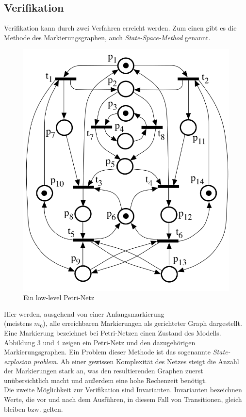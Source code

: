 \documentclass[11pt,onecolumn,a4paper,DIV=calc]{scrartcl}
\begin{document}
\newpage
\subsection{Verifikation}
Verifikation kann durch zwei Verfahren erreicht werden. Zum einen gibt es die Methode des Markierungsgraphen, auch \textit{State-Space-Method} genannt. 
\begin{figure}
\begin{center}
\includegraphics[scale=0.35]{netz3.PNG}\caption{Ein low-level Petri-Netz}
\end{center}
\end{figure}
Hier werden, ausgehend von einer Anfangsmarkierung \\(meistens $m_0$), alle erreichbaren Markierungen als gerichteter Graph dargestellt. Eine Markierung bezeichnet bei Petri-Netzen einen Zustand des Modells. Abbildung 3 und 4 zeigen ein Petri-Netz und den dazugehörigen Markierungsgraphen.
Ein Problem dieser Methode ist das sogenannte \textit{State-explosion problem}. Ab einer gewissen Komplexität des Netzes steigt die Anzahl der Markierungen stark an, was den resultierenden Graphen zuerst unübersichtlich macht und außerdem eine hohe Rechenzeit benötigt. \\
Die zweite Möglichkeit zur Verifikation sind Invarianten. Invarianten bezeichnen Werte, die vor und nach dem Ausführen, in diesem Fall von Transitionen, gleich bleiben bzw. gelten. 
\end{document}

